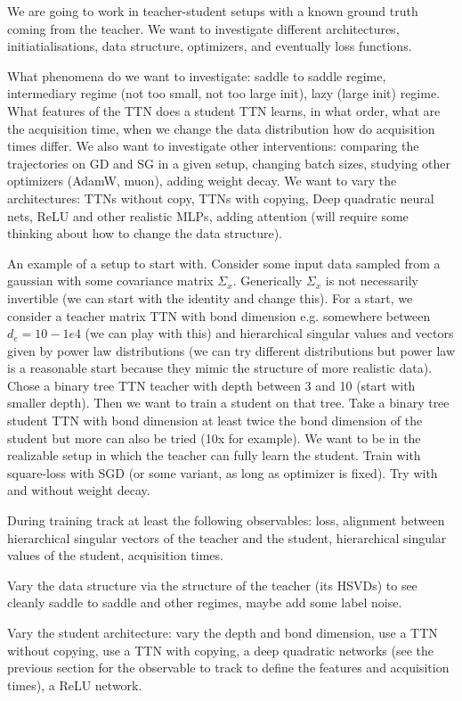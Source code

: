 \documentclass[11pt]{article}
\theoremstyle{definition}
\numberwithin{equation}{section}
\begin{document}
We are going to work in teacher-student setups with a known ground truth coming from the teacher. We want to investigate different architectures, initiatialisations, data structure, optimizers, and eventually loss functions.

What phenomena do we want to investigate: saddle to saddle regime, intermediary regime (not too small, not too large init), lazy (large init) regime. What features of the TTN does a student TTN learns, in what order, what are the acquisition time, when we change the data distribution how do acquisition times differ. We also want to investigate other interventions: comparing the trajectories on GD and SG in a given setup, changing batch sizes, studying other optimizers (AdamW, muon), adding weight decay. We want to vary the architectures: TTNs without copy, TTNs with copying, Deep quadratic neural nets, ReLU and other realistic MLPs, adding attention (will require some thinking about how to change the data structure).

An example of a setup to start with. Consider some input data sampled from a gaussian with some covariance matrix $\Sigma_x$. Generically $\Sigma_x$ is not necessarily invertible (we can start with the identity and change this). For a start, we consider a teacher matrix TTN with bond dimension e.g. somewhere between $d_e=10-1e4$ (we can play with this) and hierarchical singular values and vectors given by power law distributions (we can try different distributions but power law is a reasonable start because they mimic the structure of more realistic data). Chose a binary tree TTN teacher with depth between 3 and 10 (start with smaller depth). Then we want to train a student on that tree. Take a binary tree student TTN with bond dimension at least twice the bond dimension of the student but more can also be tried (10x for example). We want to be in the realizable setup in which the teacher can fully learn the student. Train with square-loss with SGD (or some variant, as long as optimizer is fixed). Try with and without weight decay.

During training track at least the following observables: loss, alignment between hierarchical singular vectors of the teacher and the student, hierarchical singular values of the student, acquisition times. 

Vary the data structure via the structure of the teacher (its HSVDs) to see cleanly saddle to saddle and other regimes, maybe add some label noise. 

Vary the student architecture: vary the depth and bond dimension, use a TTN without copying, use a TTN with copying, a deep quadratic networks (see the previous section for the observable to track to define the features and acquisition times), a ReLU network. 
\end{document}
